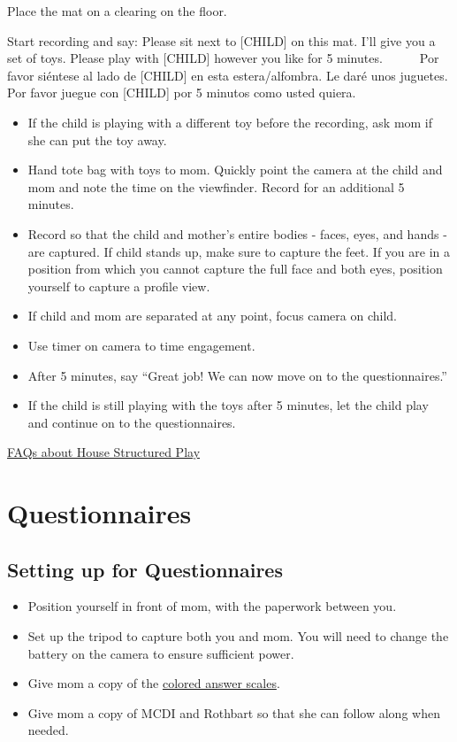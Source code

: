 \documentclass[
  12pt,
]{book}
\providecommand{\tightlist}{%
  \setlength{\itemsep}{0pt}\setlength{\parskip}{0pt}}
\begin{document}
Place the mat on a clearing on the floor.

Start recording and say: Please sit next to {[}CHILD{]} on this mat. I'll give you a set of toys. Please play with {[}CHILD{]} however you like for 5 minutes.
    Por favor siéntese al lado de {[}CHILD{]} en esta estera/alfombra. Le daré unos juguetes. Por favor juegue con {[}CHILD{]} por 5 minutos como usted quiera.

\begin{itemize}
\tightlist
\item
  If the child is playing with a different toy before the recording, ask mom if she can put the toy away.
\item
  Hand tote bag with toys to mom. Quickly point the camera at the child and mom and note the time on the viewfinder. Record for an additional 5 minutes.
\item
  Record so that the child and mother's entire bodies - faces, eyes, and hands - are captured. If child stands up, make sure to capture the feet. If you are in a position from which you cannot capture the full face and both eyes, position yourself to capture a profile view.
\item
  If child and mom are separated at any point, focus camera on child.
\item
  Use timer on camera to time engagement.
\item
  After 5 minutes, say ``Great job! We can now move on to the questionnaires.''
\item
  If the child is still playing with the toys after 5 minutes, let the child play and continue on to the questionnaires.
\end{itemize}

\protect\hyperlink{faqs_structured_play}{FAQs about House Structured Play}

\hypertarget{questionnaires}{%
\section{Questionnaires}\label{questionnaires}}

\hypertarget{setting-up-for-questionnaires}{%
\subsection{Setting up for Questionnaires}\label{setting-up-for-questionnaires}}

\begin{itemize}
\tightlist
\item
  Position yourself in front of mom, with the paperwork between you.\\
\item
  Set up the tripod to capture both you and mom. You will need to change the battery on the camera to ensure sufficient power.
\item
  Give mom a copy of the \href{https://nyu.databrary.org/volume/876/slot/39021/-/asset/191468}{colored answer scales}.\\
\item
  Give mom a copy of MCDI and Rothbart so that she can follow along when needed.
\end{itemize}
\end{document}
